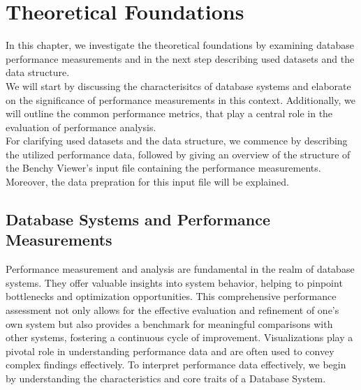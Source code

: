 
\chapter{Theoretical Foundations}\label{chapter:theoreticalFoundacions}

In this chapter, we investigate the theoretical foundations by examining database performance measurements and in the next step describing used datasets and the data structure.\\We will start by discussing the characterisitcs of database systems and elaborate on the significance of performance measurements in this context. Additionally, we will outline the common performance metrics, that play a central role in the evaluation of performance analysis.
\\ For clarifying used datasets and the data structure, we commence by describing the utilized performance data, followed by giving an overview of the structure of the Benchy Viewer's input file containing the performance measurements. Moreover, the data prepration for this input file will be explained.

\section{Database Systems and Performance Measurements}
Performance measurement and analysis are fundamental in the realm of database systems. They offer valuable insights into system behavior, helping to pinpoint bottlenecks and optimization opportunities. This comprehensive performance assessment not only allows for the effective evaluation and refinement of one's own system but also provides a benchmark for meaningful comparisons with other systems, fostering a continuous cycle of improvement. Visualizations play a pivotal role in understanding performance data and are often used to convey complex findings effectively.
To interpret performance data effectively, we begin by understanding the characteristics and core traits of a Database System.

